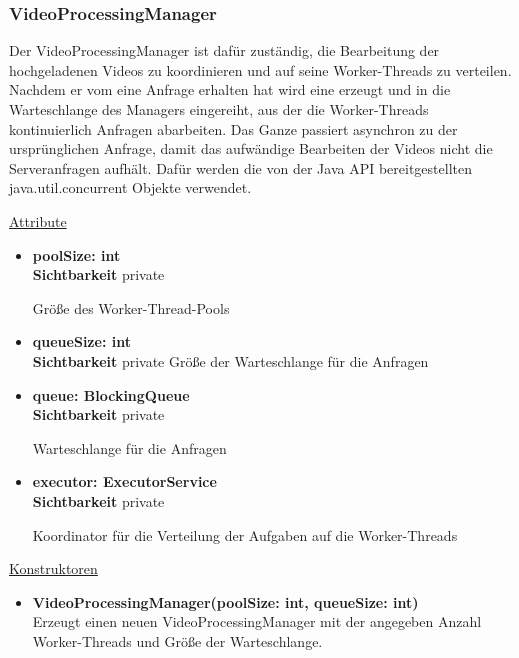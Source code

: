 \subsubsection{VideoProcessingManager} \label{service:klasse:VideoProcessingManager}
Der VideoProcessingManager ist dafür zuständig, die Bearbeitung der hochgeladenen Videos zu koordinieren und auf seine Worker-Threads zu verteilen. Nachdem er vom  eine Anfrage erhalten hat wird eine  erzeugt und in die Warteschlange des Managers eingereiht, aus der die Worker-Threads kontinuierlich Anfragen abarbeiten. Das Ganze passiert asynchron zu der ursprünglichen Anfrage, damit das aufwändige Bearbeiten der Videos nicht die Serveranfragen aufhält. Dafür werden die von der Java API bereitgestellten java.util.concurrent Objekte verwendet. \newline

\underline{Attribute}
\begin{itemize}
\itemsep0pt
\item \textbf{poolSize: int} \hfill\\ 
\textbf{Sichtbarkeit} private

Größe des Worker-Thread-Pools

\item \textbf{queueSize: int} \hfill\\ 
\textbf{Sichtbarkeit} private
Größe der Warteschlange für die Anfragen

\item \textbf{queue: BlockingQueue} \hfill\\
\textbf{Sichtbarkeit} private 

Warteschlange für die Anfragen

\item \textbf{executor: ExecutorService} \hfill\\ 
\textbf{Sichtbarkeit} private

Koordinator für die Verteilung der Aufgaben auf die Worker-Threads
\end{itemize}

\underline{Konstruktoren}
\begin{itemize}
\itemsep0pt
\item \textbf{VideoProcessingManager(poolSize: int, queueSize: int)} \hfill\\
Erzeugt einen neuen VideoProcessingManager mit der angegeben Anzahl Worker-Threads und Größe der Warteschlange.
\end{itemize}

